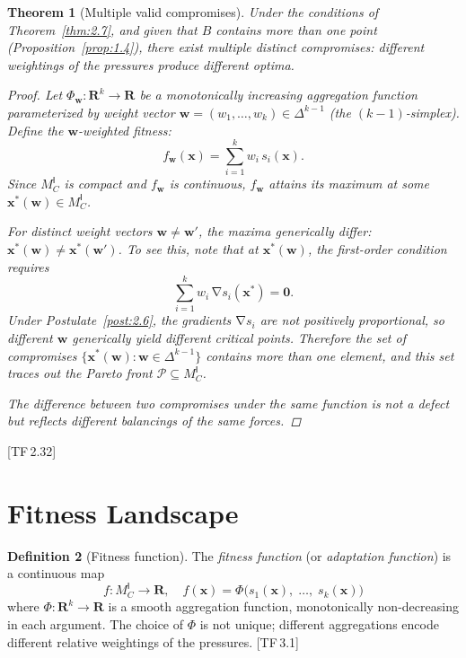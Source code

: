 \documentclass[10pt]{article}
\theoremstyle{definition}
\newtheorem{definition}{Definition}[section]
\theoremstyle{plain}
\newtheorem{theorem}[definition]{Theorem}
\theoremstyle{remark}
\newcommand{\MC}{M^{\mathsf{I}}_C}          %
\providecommand{\R}{}
\renewcommand{\R}{\mathbf{R}}               %
\newcommand{\Pareto}{\mathcal{P}}            %
\DeclareMathOperator{\grad}{\nabla}
\newcommand{\TF}[1]{\textnormal{[TF\,#1]}}  %
\begin{document}
\begin{theorem}[Multiple valid compromises]\label{thm:2.8}
Under the conditions of Theorem~\ref{thm:2.7}, and given that
$B$ contains more than one point (Proposition~\ref{prop:1.4}),
there exist multiple
distinct compromises: different weightings of the pressures produce
different optima.

\begin{proof}
Let $\Phi_{\bm{w}} : \R^k \to \R$ be a monotonically increasing
aggregation function parameterized by weight vector
$\bm{w} = (w_1, \ldots, w_k) \in \Delta^{k-1}$
(the $(k{-}1)$-simplex).
Define the $\bm{w}$-weighted fitness:
\[
  f_{\bm{w}}(\bm{x}) = \sum_{i=1}^{k} w_i \, s_i(\bm{x}).
\]
Since $\MC$ is compact and $f_{\bm{w}}$ is continuous,
$f_{\bm{w}}$ attains its maximum at some
$\bm{x}^*(\bm{w}) \in \MC$.

For distinct weight vectors $\bm{w} \neq \bm{w}'$, the maxima
generically differ: $\bm{x}^*(\bm{w}) \neq \bm{x}^*(\bm{w}')$.
To see this, note that at $\bm{x}^*(\bm{w})$, the first-order
condition requires
\[
  \sum_{i=1}^k w_i \, \grad s_i(\bm{x}^*) = \bm{0}.
\]
Under Postulate~\ref{post:2.6}, the gradients $\grad s_i$ are not
positively proportional, so different $\bm{w}$ generically yield
different critical points. Therefore the set of compromises
$\{\bm{x}^*(\bm{w}) : \bm{w} \in \Delta^{k-1}\}$ contains more than
one element, and this set traces out the \emph{Pareto front}
$\Pareto \subseteq \MC$.

The difference between two compromises under the same function is not a
defect but reflects different balancings of the same forces. \qedhere
\end{proof}
\end{theorem}

\TF{2.32}

\newpage
\section{Fitness Landscape}\label{sec:landscape}

\begin{definition}[Fitness function]\label{def:3.1}
The \emph{fitness function} (or \emph{adaptation function}) is a
continuous map
\[
  f : \MC \longrightarrow \R, \quad
  f(\bm{x}) = \Phi\bigl(s_1(\bm{x}),\; \ldots,\;
  s_k(\bm{x})\bigr)
\]
where $\Phi : \R^k \to \R$ is a smooth aggregation function,
monotonically non-decreasing in each argument. The choice of $\Phi$
is not unique; different aggregations encode different relative weightings
of the pressures. \TF{3.1}
\end{definition}
\end{document}
